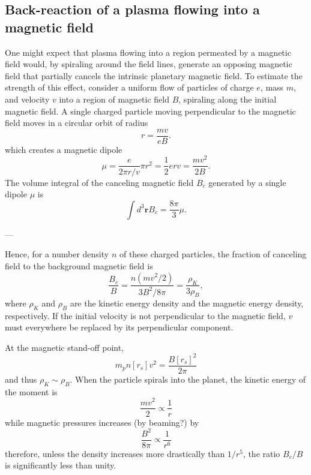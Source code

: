\documentclass{emulateapj}
\begin{document}
\newpage


\subsection{Back-reaction of a plasma flowing into a magnetic field}
\label{ss:offset}

One might expect that plasma flowing into a region permeated by a magnetic field would, by spiraling around the field lines, generate an opposing magnetic field that partially cancels the intrinsic planetary magnetic field. 
To estimate the strength of this effect, consider a uniform flow of particles of charge $e$, mass $m$, and velocity $v$ into a region of magnetic field $B$, spiraling along the initial magnetic field. 
A single charged particle moving perpendicular to the magnetic field moves in a circular orbit of radius 
\begin{equation}
r=\frac{mv}{eB}.
\end{equation}
which creates a magnetic dipole
\begin{equation}
\mu = \frac{e}{2\pi r/v} \pi r^2 = \frac{1}{2} e r v = \frac{mv^2}{2B}.
\end{equation}
The volume integral of the canceling magnetic field $B_c$ generated by a single dipole $\mu$ is
\begin{equation}
\int d^3{\boldsymbol r} B_c = \frac{8\pi}{3} \mu.
\end{equation}

---

Hence, for a number density $n$ of these charged particles, the fraction of canceling field to the background magnetic field is
\begin{equation}
\frac{B_c}{B} = \frac{n(mv^2/2)}{3 B^2/8\pi}= \frac{\rho_K}{3\rho_B},
\end{equation}
where $\rho_K$ and $\rho_B$ are the kinetic energy density and the magnetic energy density, respectively. If the initial velocity is not perpendicular to the magnetic field, $v$ must everywhere be replaced by its perpendicular component.

%
At the magnetic stand-off point, 
\begin{equation}
m_p n[r_s] v^2 = \frac{B[r_s]^2}{2\pi }
\end{equation}
and thus $\rho_K \sim \rho _B$. When the particle spirals into the planet, the kinetic energy of the moment is
\begin{equation}
\frac{mv^2}{2} \propto \frac{1}{r}
\end{equation}
while magnetic pressures increases (by beaming?) by 
\begin{equation}
\frac{B^2}{8\pi } \propto \frac{1}{r^6}
\end{equation}
therefore, unless the density increases more drastically than $1/r^5$, the ratio $B_c/B$ is significantly less than unity. 
\end{document}
